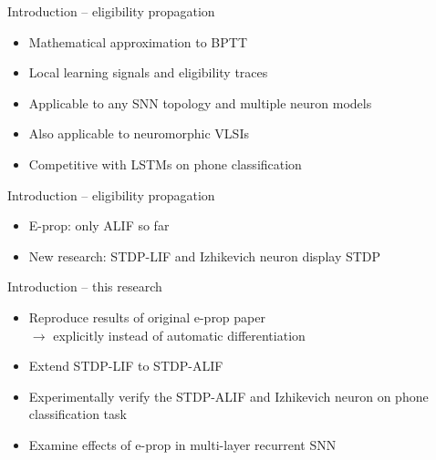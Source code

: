 \documentclass[t]{beamer}
\begin{document}
  \begin{frame}{Introduction -- eligibility propagation}
    \begin{itemize}[label=--]
      \item Mathematical approximation to BPTT
      \item Local learning signals and eligibility traces
      \item Applicable to any SNN topology and multiple neuron models
      \item Also applicable to neuromorphic VLSIs
      \item Competitive with LSTMs on phone classification
    \end{itemize}
  \end{frame}

  \begin{frame}{Introduction -- eligibility propagation}
    \begin{itemize}[label=--]
      \item E-prop: only ALIF so far
      \item New research: STDP-LIF and Izhikevich neuron display STDP
    \end{itemize}
  \end{frame}

  \begin{frame}{Introduction -- this research}
    \begin{itemize}[label=--]
      \item Reproduce results of original e-prop paper\\$\rightarrow$ explicitly instead of automatic differentiation
      \item Extend STDP-LIF to STDP-ALIF
      \item Experimentally verify the STDP-ALIF and Izhikevich neuron on phone classification task
      \item Examine effects of e-prop in multi-layer recurrent SNN
    \end{itemize}
  \end{frame}
\end{document}
